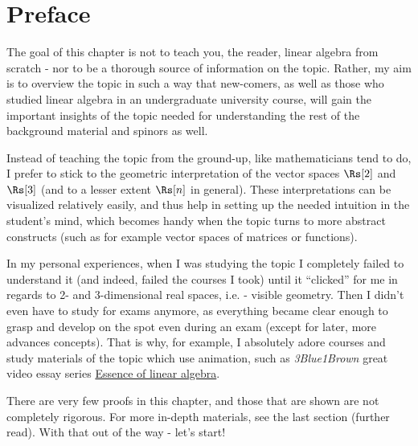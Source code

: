 \section{Preface}
The goal of this chapter is not to teach you, the reader, linear algebra from scratch - nor to be a thorough source of information on the topic. Rather, my aim is to overview the topic in such a way that new-comers, as well as those who studied linear algebra in an undergraduate university course, will gain the important insights of the topic needed for understanding the rest of the background material and spinors as well.

Instead of teaching the topic from the ground-up, like mathematicians tend to do, I prefer to stick to the geometric interpretation of the vector spaces $\Rs[2]$ and $\Rs[3]$ (and to a lesser extent $\Rs[n]$ in general). These interpretations can be visualized relatively easily, and thus help in setting up the needed intuition in the student's mind, which becomes handy when the topic turns to more abstract constructs (such as for example vector spaces of matrices or functions).

In my personal experiences, when I was studying the topic I completely failed to understand it (and indeed, failed the courses I took) until it \enquote{clicked} for me in regards to 2- and 3-dimensional real spaces, i.e. - visible geometry. Then I didn't even have to study for exams anymore, as everything became clear enough to grasp and develop on the spot even during an exam (except for later, more advances concepts). That is why, for example, I absolutely adore courses and study materials of the topic which use animation, such as \textit{3Blue1Brown} great video essay series \href{https://www.3blue1brown.com/topics/linear-algebra}{Essence of linear algebra}.

There are very few proofs in this chapter, and those that are shown are not completely rigorous. For more in-depth materials, see the last section (further read). With that out of the way - let's start!
